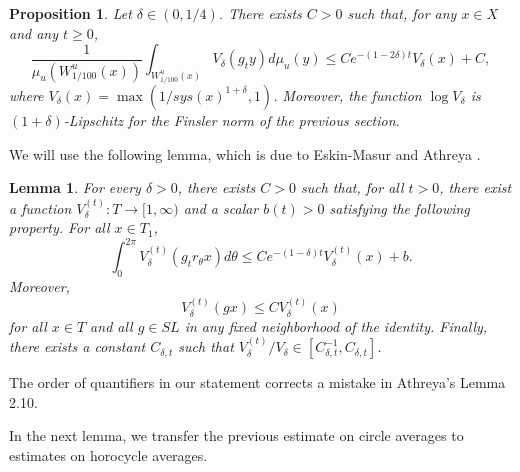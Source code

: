 \documentclass[10pt, pagebackref, a4paper, oneside]{amsart}
\newtheorem{prop}{Proposition}
\newtheorem{lem}{Lemma}
\begin{document}
\begin{prop}
Let $\delta\in (0,1/4)$. There exists $C>0$ such that, for any $x\in
X$ and any $t\geq 0$,
  \begin{equation}
  \label{eqVdeltaWu}
  \frac{1}{\mu_u(W^u_{1/100}(x))}\int_{W^u_{1/100}(x)} V_\delta( g_t y) d\mu_u(y)
  \leq C e^{-(1-2\delta) t} V_\delta(x)+C,
  \end{equation}
where $V_\delta(x)=\max(1/sys(x)^{1+\delta}, 1)$. Moreover, the
function $\log V_\delta$ is $(1+\delta)$-Lipschitz for the Finsler
norm of the previous section.
\end{prop}

We will use the following lemma, which is due to Eskin-Masur
\cite{eskin_masur} and Athreya \cite{athreya}.
\begin{lem}
For every $\delta>0$, there exists $C>0$ such that, for all $t>0$,
there exist a function $V^{(t)}_\delta : T \to [1,\infty)$ and a
scalar $b(t)>0$ satisfying the following property. For all $x\in
T_1$,
  \begin{equation}
  \label{good_vdelta}
  \int_0^{2\pi} V_\delta^{(t)}(g_t r_\theta x) d \theta
  \leq C e^{-(1-\delta)t} V_\delta^{(t)}(x) + b.
  \end{equation}
Moreover,
  \begin{equation}
  \label{Vdeltasmooth}
  V_\delta^{(t)}(g x) \leq C V_\delta^{(t)}(x)
  \end{equation}
for all $x\in T$ and all $g\in SL$ in any fixed neighborhood of the
identity. Finally, there exists a constant $C_{\delta,t}$ such that
$V_\delta^{(t)}/ V_\delta\in [C_{\delta,t}^{-1}, C_{\delta,t}]$.
\end{lem}
The order of quantifiers in our statement corrects a mistake in
Athreya's Lemma 2.10.

In the next lemma, we transfer the previous estimate on circle
averages to estimates on horocycle averages.
\end{document}
